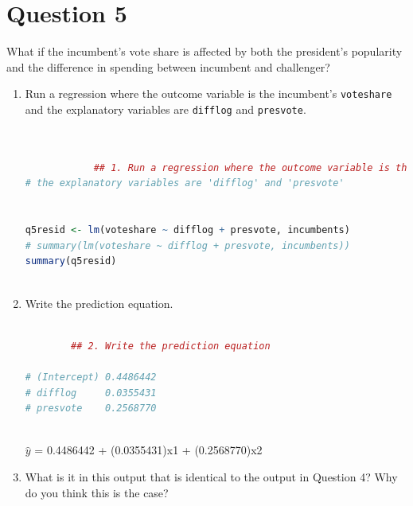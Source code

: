 \documentclass[12pt,letterpaper]{article}
\begin{document}
	\newpage	

\section*{Question 5}%
\noindent What if the incumbent's vote share is affected by both the president's popularity and the difference in spending between incumbent and challenger? 
	\begin{enumerate}
		\item Run a regression where the outcome variable is the incumbent's \texttt{voteshare} and the explanatory variables are \texttt{difflog} and \texttt{presvote}.	\vspace{5cm}
		
			\begin{lstlisting}[language=R]
			
			
			## 1. Run a regression where the outcome variable is the incumbent's 'voteshare' and 
# the explanatory variables are 'difflog' and 'presvote'


q5resid <- lm(voteshare ~ difflog + presvote, incumbents)
# summary(lm(voteshare ~ difflog + presvote, incumbents))
summary(q5resid)
			
		\end{lstlisting}
		
		\item Write the prediction equation.	\vspace{5cm}
		
		\begin{lstlisting}[language=R]
		
		## 2. Write the prediction equation

# (Intercept) 0.4486442
# difflog     0.0355431
# presvote    0.2568770
		
		\end{lstlisting}
		
		
		$\hat{y}$	= 0.4486442 + (0.0355431)x1 + (0.2568770)x2
		
		
		\item What is it in this output that is identical to the output in Question 4? Why do you think this is the case?%
	\end{enumerate}
\end{document}
